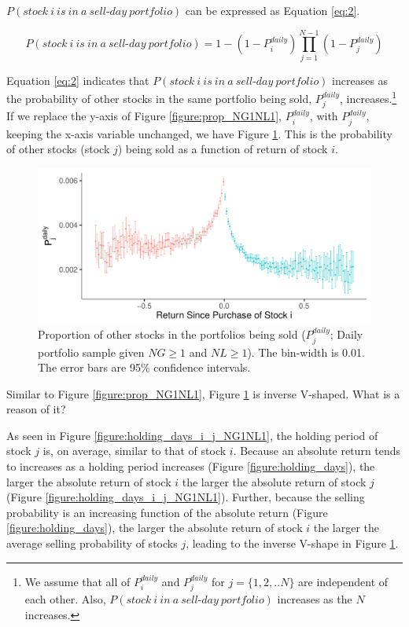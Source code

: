 \documentclass[11pt, a4paper]{article}
\begin{document}
$P(stock~i~is~in~a~sell\mbox{-}day~portfolio)$ can be expressed as Equation \ref{eq:2}.

\begin{equation}
\label{eq:2}
P(stock~i~is~in~a~sell\mbox{-}day~portfolio) =1-(1-P^{daily}_{i})\prod_{j=1}^{N-1}(1-P^{daily}_{j})
\end{equation}

Equation \ref{eq:2} indicates that $P(stock~i~is~in~a~sell\mbox{-}day~portfolio)$ increases as the probability of other stocks in the same portfolio being sold, $P^{daily}_{j}$, increases.\footnote{We assume that all of $P^{daily}_{i}$ and $P^{daily}_{j}$ for $j=\{1,2,..N\}$ are independent of each other. Also, $P(stock~i~in~a~sell\mbox{-}day~portfolio)$ increases as the $N$ increases.}\\

If we replace the y-axis of Figure \ref{figure:prop_NG1NL1}, $P^{daily}_{i}$, with $P^{daily}_{j}$, keeping the x-axis variable unchanged, we have Figure \ref{figure:prop_others_NG1NL1}. This is the probability of other stocks (stock $j$) being sold as a function of return of stock $i$.

\begin{figure}[H]
	\centering
	\includegraphics[width=0.8\columnwidth]{barc_other_sold_daily_NG1_NL1_3.pdf}
	\caption{Proportion of other stocks in the portfolios being sold ($P^{daily}_{j}$; Daily portfolio sample given $NG\geq1$ and $NL\geq1$). The bin-width is 0.01. The error bars are 95\% confidence intervals.}
	\label{figure:prop_others_NG1NL1}
\end{figure}

Similar to Figure \ref{figure:prop_NG1NL1}, Figure \ref{figure:prop_others_NG1NL1} is inverse V-shaped. What is a reason of it? 

As seen in Figure \ref{figure:holding_days_i_j_NG1NL1}, the holding period of stock $j$ is, on average, similar to that of stock $i$. Because an absolute return tends to increases as a holding period increases (Figure \ref{figure:holding_days}), the larger the absolute return of stock $i$ the larger the absolute return of stock $j$ (Figure \ref{figure:holding_days_i_j_NG1NL1}). Further, because the selling probability is an increasing function of the absolute return (Figure \ref{figure:holding_days}), the larger the absolute return of stock $i$ the larger the average selling probability of stocks $j$, leading to the inverse V-shape in Figure \ref{figure:prop_others_NG1NL1}. 
\end{document}
